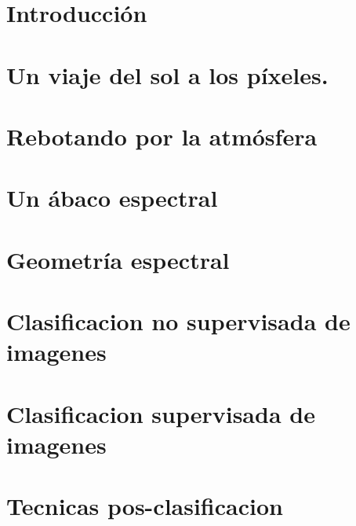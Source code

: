\documentclass[a4paper]{book}
\begin{document}
\chapter*{Introducción}
\label{sec:intro}
\newpage
\chapter{Un viaje del sol a los p\'ixeles.}
\label{viaje}

\newpage

\chapter{Rebotando por la atm\'osfera}
\label{rebotando}

\newpage

\chapter{Un \'abaco espectral}
\label{abaco}

\newpage

\chapter{Geometr\'ia espectral}
\label{rotaciones}

\newpage

\chapter{Clasificacion no supervisada de imagenes}
\label{otrolado}

\newpage

\chapter{Clasificacion supervisada de imagenes}
\label{educando}

\newpage


\chapter{Tecnicas pos-clasificacion}
\label{pos}

\newpage
\end{document}
